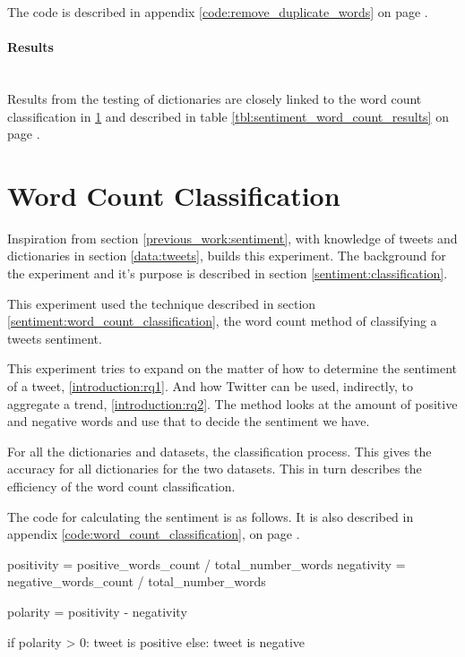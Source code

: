 The code is described in appendix \ref{code:remove_duplicate_words} on page
\pageref{code:remove_duplicate_words}.

\paragraph{Results}
\hspace{0pt}\\
Results from the testing of dictionaries are closely linked to the word count
classification in \ref{experiments:word_count_classification} and described in
table \ref{tbl:sentiment_word_count_results} on page
\pageref{tbl:sentiment_word_count_results}.
%

\section{Word Count Classification}\label{experiments:word_count_classification}
Inspiration from section \ref{previous_work:sentiment}, with knowledge of tweets
and dictionaries in section \ref{data:tweets}, builds this experiment. The
background for the experiment and it's purpose is described in section
\ref{sentiment:classification}. 

This experiment used the technique described in section
\ref{sentiment:word_count_classification}, the word count method of classifying
a tweets sentiment.  

This experiment tries to expand on the matter of how to determine the sentiment
of a tweet, \ref{introduction:rq1}. And how Twitter can be used, indirectly, to
aggregate a trend, \ref{introduction:rq2}.
The method looks at the amount of positive and negative words and use
that to decide the sentiment we have.

For all the dictionaries and datasets, the classification process. This
gives the accuracy for all dictionaries for the two datasets. This in turn
describes the efficiency of the word count classification.

The code for calculating the sentiment is as follows. It is also described in
appendix \ref{code:word_count_classification}, on page
\pageref{code:word_count_classification}.
\begin{python}
positivity = positive_words_count / total_number_words
negativity = negative_words_count / total_number_words

polarity = positivity - negativity

if polarity > 0:
    tweet is positive
else:
    tweet is negative
\end{python}

